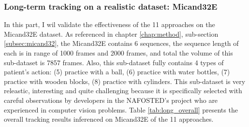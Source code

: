 \subsubsection{Long-term tracking on a realistic dataset: Micand32E}
In this part, I wil validate the effectiveness of the 11 approaches on the Micand32E dataset. As referenced in chapter \ref{chap:method}, sub-section \ref{subsec:micand32}, the Micand32E contains 6 sequences, the sequence length of each is in range of 1000 frames and 2000 frames, and total the volume of this sub-dataset is 7857 frames. Also, this sub-dataset fully contains 4 types of patient’s action: (5) practice with a ball, (6) practice with water bottles, (7) practice with wooden blocks, (8) practice with cylinders. This sub-dataset is very releastic, interesting and quite challenging because it is specifically selected with careful observations  by developers in the NAFOSTED’s project who are experienced in computer vision problems.
Table \ref{tab:long_overall} presents the overall tracking results inferenced on Micand32E of the 11 approaches.

